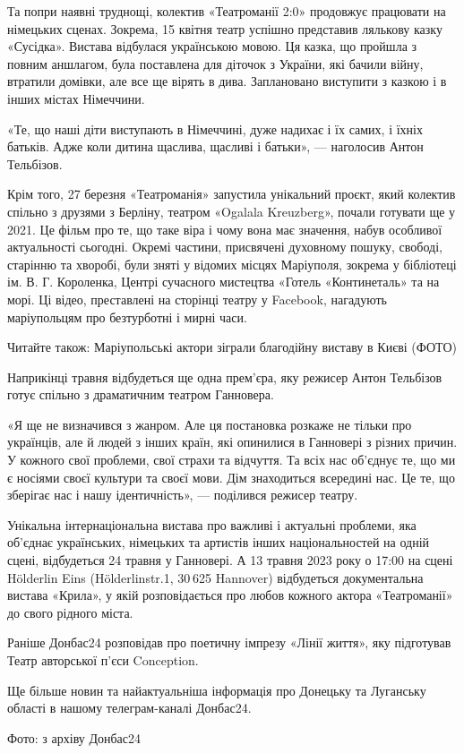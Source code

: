 Та попри наявні труднощі, колектив «Театроманії 2:0» продовжує працювати на
німецьких сценах. Зокрема, 15 квітня театр успішно представив лялькову казку
«Сусідка». Вистава відбулася українською мовою. Ця казка, що пройшла з повним
аншлагом, була поставлена для діточок з України, які бачили війну, втратили
домівки, але все ще вірять в дива. Заплановано виступити з казкою і в інших
містах Німеччини.

«Те, що наші діти виступають в Німеччині, дуже надихає і їх самих, і їхніх
батьків. Адже коли дитина щаслива, щасливі і батьки», — наголосив Антон
Тельбізов.

Крім того, 27 березня «Театроманія» запустила унікальний проєкт, який колектив
спільно з друзями з Берліну, театром «Ogalala Kreuzberg», почали готувати ще у
2021. Це фільм про те, що таке віра і чому вона має значення, набув особливої
актуальності сьогодні. Окремі частини, присвячені духовному пошуку, свободі,
старінню та хворобі, були зняті у відомих місцях Маріуполя, зокрема у
бібліотеці ім. В. Г. Короленка, Центрі сучасного мистецтва «Готель
«Континеталь» та на морі. Ці відео, преставлені на сторінці театру у Facebook,
нагадують маріупольцям про безтурботні і мирні часи.

Читайте також: Маріупольські актори зіграли благодійну виставу в Києві (ФОТО)

Наприкінці травня відбудеться ще одна прем'єра, яку режисер Антон Тельбізов
готує спільно з драматичним театром Ганновера.

«Я ще не визначився з жанром. Але ця постановка розкаже не тільки про
українців, але й людей з інших країн, які опинилися в Ганновері з різних
причин. У кожного свої проблеми, свої страхи та відчуття. Та всіх нас об'єднує
те, що ми є носіями своєї культури та своєї мови. Дім знаходиться всередині
нас. Це те, що зберігає нас і нашу ідентичність», — поділився режисер театру.

Унікальна інтернаціональна вистава про важливі і актуальні проблеми, яка
об'єднає українських, німецьких та артистів інших національностей на одній
сцені, відбудеться 24 травня у Ганновері. А 13 травня 2023 року о 17:00 на
сцені Hölderlin Eins (Hölderlinstr.1, 30 625 Hannover) відбудеться
документальна вистава «Крила», у якій розповідається про любов кожного актора
«Театроманії» до свого рідного міста.

Раніше Донбас24 розповідав про поетичну імпрезу «Лінії життя», яку підготував
Театр авторської п'єси Conception.

Ще більше новин та найактуальніша інформація про Донецьку та Луганську області
в нашому телеграм-каналі Донбас24.

Фото: з архіву Донбас24
